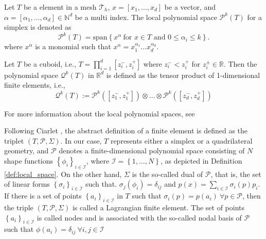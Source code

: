\begin{definition}
    \label{def:local_space}
    Let $T$ be a element in a mesh $\mathcal{T}_{h} $,  $x = \left[ x_{1}, \ldots, x_{d} \right] $ be a vector, and $\alpha  = \left[ \alpha _{1}, \ldots, \alpha _{d} \right] \in \mathbb{N} ^{d} $ be a multi index.
    The local polynomial space $\mathcal{P} ^{k}( T) $ for a simplex is denoted as
    \begin{equation}
    \label{eq:pol_space}
        \mathcal{P}^{k}( T) =  \mathrm{span}\left\{ x^{\alpha } \ \text{for } x \in T \text{ and } 0 \le  \alpha _{i} \le k \right\}.
    \end{equation}
    where  $x^{\alpha }$ is a monomial such that $x^{\alpha } = x_{1}^{\alpha _{1}} \ldots x_{d}^{\alpha _{d}}$.

    Let $T$ be a cuboid, i.e.,  $T = \prod_{i=1}^{d} [z_{i}^{-},z_{i}^{+}]$ where $z_{i}^{-}< z_{i}^{+}$ for $z_{i}^{\pm} \in \mathbb{R} $. Then the polynomial space $\mathcal{Q}^{k}( T)$  in $\mathbb{R} ^{d}$ is defined as the tensor product of 1-dimensional
    finite elements, i.e.,
      \[
    \mathcal{Q} ^{k}(T)  := \mathcal{P}^{k}( [z_{1}^{-},z_{1}^{+}] ) \otimes \ldots \otimes \mathcal{P}^{k}( [z_{d}^{-},z_{d}^{+}] )
    \]
\end{definition}
For more information about the local polynomial spaces, see \cite[Chapter 6.4, 7.3]{ErnGuermond2021}

Following Ciarlet \cite[pp.93]{ciarlet1991basic}, the abstract definition of a finite element is defined as the triplet $( T, \mathcal{P}, \Sigma ) $.
In our case, $T$ represents either a simplex or a quadrilateral geometry, and $\mathcal{P}$ denotes a finite-dimensional polynomial space consisting of $N$ shape functions $\left\{ \phi_{i} \right\}_{i\in \mathcal{I} } $, where $\mathcal{I} = \left\{
1, \ldots, N \right\} $, as depicted in Definition \ref{def:local_space}.
On the other hand, $\Sigma $ is the so-called dual of $\mathcal{P}$, that is, the set of linear forms $\left\{ \sigma _{i} \right\}_{i \in \mathcal{I} } $ such that. $ \sigma_{j} ( \phi_{i} ) = \delta _{ij}$ and $p( x) = \sum_{i\in \mathcal{I} }^{} \sigma_{i} ( p) p_{i} $.
If there is a set of points $\left\{ a_{i} \right\}_{i \in \mathcal{I} } $  in $T$ such that
$\sigma_{i}( p) = p( a_{i}) \  \forall p \in \mathcal{P}$,  then the triple $( T, \mathcal{P}, \Sigma  ) $ is called a Lagrangian finite element. The set of points $\left\{ a_{i} \right\}_{i \in \mathcal{I} }  $ is called nodes and is associated with the
so-called nodal basis of $\mathcal{P} $ such that  $\phi ( a_{i}) = \delta _{ij} \ \forall i,j  \in \mathcal{I} $

